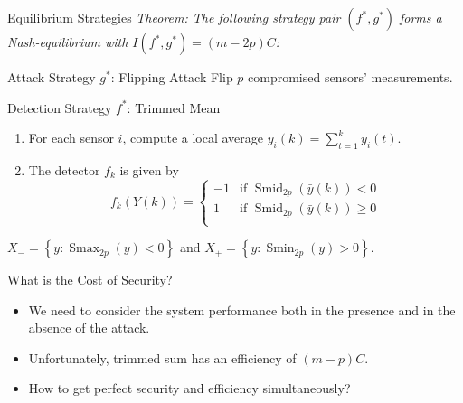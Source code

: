 \documentclass[10pt]{beamer}
\newcommand{\tikzdir}[1]{#1.tikz}
\newcommand{\inputtikz}[1]{}}
\DeclareMathOperator{\Smin}{Smin}
\DeclareMathOperator{\Smid}{Smid}
\DeclareMathOperator{\Smax}{Smax}
\begin{document}
\begin{frame}{Equilibrium Strategies}
  \it Theorem: The following strategy pair $(f^*,g^*)$ forms a Nash-equilibrium with $I(f^*,g^*) = (m-2p)C$:
  \begin{block}{Attack Strategy $g^*$: Flipping Attack}
    Flip $p$ compromised sensors' measurements.
  \end{block}
  \begin{block}{Detection Strategy $f^*$: Trimmed Mean}
    \begin{enumerate}
    \item For each sensor $i$, compute a local average $ \bar y_i(k) = \sum_{t=1}^k y_i(t)$.
    \item The detector $f_k$ is given by
      \begin{displaymath}
        f_k(Y(k)) = \begin{cases}
          -1 &\text{if }\Smid_{2p}(\bar y(k))< 0\\
          1 &\text{if }\Smid_{2p}(\bar y(k))\geq 0\\
        \end{cases}
      \end{displaymath}
    \end{enumerate}
  \end{block}
  $X_- = \left\{y:\Smax_{2p}(y) < 0\right\}$ and $X_+ = \left\{y:\Smin_{2p}(y) > 0\right\}$.


\end{frame}

\begin{frame}{What is the Cost of Security?}
  \begin{itemize}
  \item We need to consider the system performance both in the presence and in the absence of the attack.
    \vspace{0.5cm}
    \begin{center}
      \inputtikz{fun_lim2}
    \end{center}
  \item Unfortunately, trimmed sum has an efficiency of $(m-p)C$.
  \item How to get perfect security and efficiency simultaneously?
  \end{itemize}
\end{frame}
\end{document}
